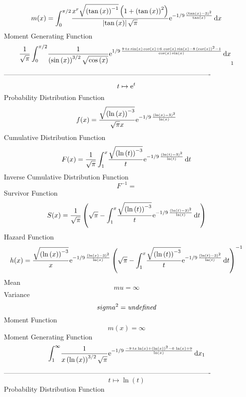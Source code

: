 \documentclass[12pt]{article}
\begin{document}
 $$ m(x) = \int_{0}^{\pi/2}\!{\frac {{x}^{r}\sqrt { \left( \tan \left( x \right) 
 \right) ^{-1}} \left( 1+ \left( \tan \left( x \right)  \right) ^{2}
 \right) }{ \left| \tan \left( x \right)  \right| \sqrt {\pi}}{{\rm e}
^{-1/9\,{\frac { \left( \tan \left( x \right) -3 \right) ^{2}}{\tan
 \left( x \right) }}}}}\,{\rm d}x
$$ Moment Generating Function 
 $${\frac {1}{\sqrt {\pi}}\int_{0}^{\pi/2}\!{\frac {1}{ \left( \sin
 \left( x \right)  \right) ^{3/2}\sqrt {\cos \left( x \right) }}{
{\rm e}^{1/9\,{\frac {9\,tx\sin \left( x \right) \cos \left( x
 \right) +6\,\cos \left( x \right) \sin \left( x \right) -8\, \left( 
\cos \left( x \right)  \right) ^{2}-1}{\cos \left( x \right) \sin
 \left( x \right) }}}}}\,{\rm d}x}_{{1}}
$$-------------------------------------------------------------------------------------------  \\$$t\mapsto {{\rm e}^{t}}
$$Probability Distribution Function 
$$  f(x)={\frac {\sqrt { \left( \ln  \left( x \right)  \right) ^{-3}}}{\sqrt {
\pi}x}{{\rm e}^{-1/9\,{\frac { \left( \ln  \left( x \right) -3
 \right) ^{2}}{\ln  \left( x \right) }}}}}
$$Cumulative Distribution Function  
 $$F(x)={\frac {1}{\sqrt {\pi}}\int_{1}^{x}\!{\frac {\sqrt { \left( \ln 
 \left( t \right)  \right) ^{-3}}}{t}{{\rm e}^{-1/9\,{\frac { \left( 
\ln  \left( t \right) -3 \right) ^{2}}{\ln  \left( t \right) }}}}}
\,{\rm d}t}
$$ Inverse Cumulative Distribution Function 
  $$F^{-1} = $$Survivor Function 
 $$ S(x)={\frac {1}{\sqrt {\pi}} \left( \sqrt {\pi}-\int_{1}^{x}\!{\frac {
\sqrt { \left( \ln  \left( t \right)  \right) ^{-3}}}{t}{{\rm e}^{-1/9
\,{\frac { \left( \ln  \left( t \right) -3 \right) ^{2}}{\ln  \left( t
 \right) }}}}}\,{\rm d}t \right) }
$$ Hazard Function 
 $$ h(x)={\frac {\sqrt { \left( \ln  \left( x \right)  \right) ^{-3}}}{x}{
{\rm e}^{-1/9\,{\frac { \left( \ln  \left( x \right) -3 \right) ^{2}}{
\ln  \left( x \right) }}}} \left( \sqrt {\pi}-\int_{1}^{x}\!{\frac {
\sqrt { \left( \ln  \left( t \right)  \right) ^{-3}}}{t}{{\rm e}^{-1/9
\,{\frac { \left( \ln  \left( t \right) -3 \right) ^{2}}{\ln  \left( t
 \right) }}}}}\,{\rm d}t \right) ^{-1}}
$$Mean 
 $$ mu=\infty 
$$ Variance 
 $$ sigma^2 = {\it undefined}
$$Moment Function 
 $$ m(x) = \infty 
$$ Moment Generating Function 
 $$\int_{1}^{\infty }\!{\frac {1}{x \left( \ln  \left( x \right) 
 \right) ^{3/2}\sqrt {\pi}}{{\rm e}^{-1/9\,{\frac {-9\,tx\ln  \left( x
 \right) + \left( \ln  \left( x \right)  \right) ^{2}-6\,\ln  \left( x
 \right) +9}{\ln  \left( x \right) }}}}}\,{\rm d}x_{{1}}
$$-------------------------------------------------------------------------------------------  \\$$t\mapsto \ln  \left( t \right) 
$$Probability Distribution Function 
\end{document}
